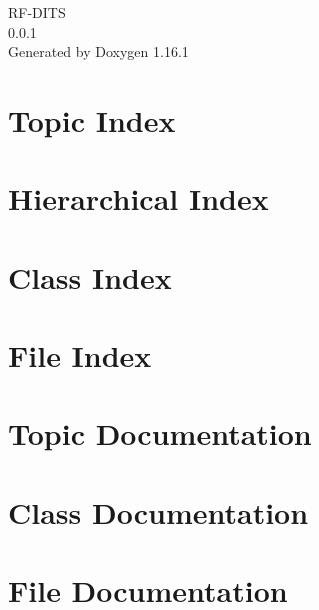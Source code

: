 \documentclass[twoside]{book}
\newcommand{\+}{\discretionary{\mbox{\scriptsize$\hookleftarrow$}}{}{}}
\newcommand{\clearemptydoublepage}{%
    \newpage{\pagestyle{empty}\cleardoublepage}%
  }
\begin{document}
  \raggedbottom
    \hypersetup{pageanchor=false,
                bookmarksnumbered=true,
                pdfencoding=unicode
               }
  \begin{titlepage}
  \vspace*{7cm}
  \begin{center}%
  {\Large RF-\/\+DITS}\\
  [1ex]\large 0.\+0.\+1 \\
  \vspace*{1cm}
  {\large Generated by Doxygen 1.16.1}\\
  \end{center}
  \end{titlepage}
  \clearemptydoublepage
  \tableofcontents
  \clearemptydoublepage
  \hypersetup{pageanchor=true}
\chapter{Topic Index}

\chapter{Hierarchical Index}

\chapter{Class Index}

\chapter{File Index}

\chapter{Topic Documentation}







\chapter{Class Documentation}






\chapter{File Documentation}






  \backmatter
  \newpage
  \clearemptydoublepage
  \printindex
\end{document}
